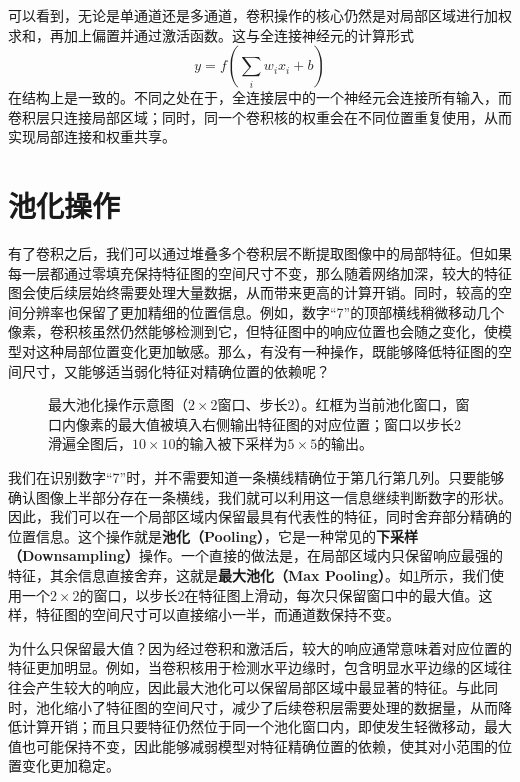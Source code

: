 可以看到，无论是单通道还是多通道，卷积操作的核心仍然是对局部区域进行加权求和，再加上偏置并通过激活函数。这与全连接神经元的计算形式
$$
y=f\left(\sum_i w_i x_i+b\right)
$$
在结构上是一致的。不同之处在于，全连接层中的一个神经元会连接所有输入，而卷积层只连接局部区域；同时，同一个卷积核的权重会在不同位置重复使用，从而实现局部连接和权重共享。

\section{池化操作}

有了卷积之后，我们可以通过堆叠多个卷积层不断提取图像中的局部特征。但如果每一层都通过零填充保持特征图的空间尺寸不变，那么随着网络加深，较大的特征图会使后续层始终需要处理大量数据，从而带来更高的计算开销。同时，较高的空间分辨率也保留了更加精细的位置信息。例如，数字“7”的顶部横线稍微移动几个像素，卷积核虽然仍然能够检测到它，但特征图中的响应位置也会随之变化，使模型对这种局部位置变化更加敏感。那么，有没有一种操作，既能够降低特征图的空间尺寸，又能够适当弱化特征对精确位置的依赖呢？

\begin{figure}[H]
    \caption{最大池化操作示意图（$2\times 2$窗口、步长2）。红框为当前池化窗口，窗口内像素的最大值被填入右侧输出特征图的对应位置；窗口以步长2滑遍全图后，$10\times 10$的输入被下采样为$5\times 5$的输出。}
    \label{fig:pooling}
\end{figure}

我们在识别数字“7”时，并不需要知道一条横线精确位于第几行第几列。只要能够确认图像上半部分存在一条横线，我们就可以利用这一信息继续判断数字的形状。因此，我们可以在一个局部区域内保留最具有代表性的特征，同时舍弃部分精确的位置信息。这个操作就是\textbf{池化（Pooling）}，它是一种常见的\textbf{下采样（Downsampling）}操作。一个直接的做法是，在局部区域内只保留响应最强的特征，其余信息直接舍弃，这就是\textbf{最大池化（Max Pooling）}。如\cref{fig:pooling}所示，我们使用一个$2\times2$的窗口，以步长$2$在特征图上滑动，每次只保留窗口中的最大值。这样，特征图的空间尺寸可以直接缩小一半，而通道数保持不变。

为什么只保留最大值？因为经过卷积和激活后，较大的响应通常意味着对应位置的特征更加明显。例如，当卷积核用于检测水平边缘时，包含明显水平边缘的区域往往会产生较大的响应，因此最大池化可以保留局部区域中最显著的特征。与此同时，池化缩小了特征图的空间尺寸，减少了后续卷积层需要处理的数据量，从而降低计算开销；而且只要特征仍然位于同一个池化窗口内，即使发生轻微移动，最大值也可能保持不变，因此能够减弱模型对特征精确位置的依赖，使其对小范围的位置变化更加稳定。

